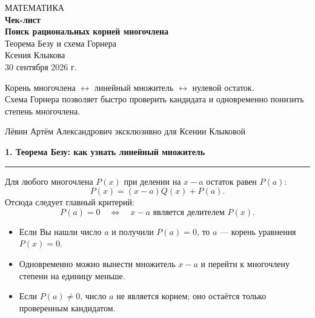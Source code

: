 \documentclass[a4paper,12pt]{article}
\newcommand{\sectiontitle}[1]{%
  \vspace{0.55em}%
  {\Large\bfseries\color{darkaccent}#1}\par
  \vspace{0.25em}\color{linegray}\hrule\color{textgray}\vspace{0.45em}
}
\newcommand{\checkline}[1]{\item[$\square$] #1}
\begin{document}
\color{textgray}

\thispagestyle{empty}
\begin{center}
\vspace*{2.4cm}
{\small\color{softgray}\MakeUppercase{математика}}\\[1.1cm]
{\Huge\bfseries\color{darkaccent}Чек-лист}\\[0.45cm]
{\LARGE\bfseries Поиск рациональных корней многочлена}\\[0.28cm]
{\Large Теорема Безу и схема Горнера}\\[1.35cm]

{\large Ксения Клыкова}\\[0.45cm]
{\normalsize 30 сентября 2026 г.}\\[1.5cm]

\begin{minipage}{0.72\textwidth}
\centering
\color{softgray}
Корень многочлена $\longleftrightarrow$ линейный множитель $\longleftrightarrow$ нулевой остаток.\\[0.35cm]
Схема Горнера позволяет быстро проверить кандидата и одновременно понизить степень многочлена.
\end{minipage}
\end{center}

\vfill
\begin{center}
{\small\color{darkaccent}Лёвин Артём Александрович эксклюзивно для Ксении Клыковой}
\end{center}
\vspace{0.6cm}
\clearpage

\sectiontitle{1. Теорема Безу: как узнать линейный множитель}

Для любого многочлена $P(x)$ при делении на $x-a$ остаток равен $P(a)$:
\[
P(x)=(x-a)Q(x)+P(a).
\]
Отсюда следует главный критерий:
\[
\boxed{\;P(a)=0\quad\Longleftrightarrow\quad x-a\text{ является делителем }P(x).\;}
\]

\begin{itemize}
  \checkline{Если Вы нашли число $a$ и получили $P(a)=0$, то $a$ --- корень уравнения $P(x)=0$.}
  \checkline{Одновременно можно вынести множитель $x-a$ и перейти к многочлену степени на единицу меньше.}
  \checkline{Если $P(a)\ne0$, число $a$ не является корнем; оно остаётся только проверенным кандидатом.}
\end{itemize}
\end{document}
